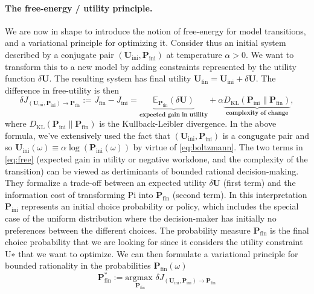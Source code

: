 \documentclass{article} %
\def\U{\mathbf{U}}
\def\P{\mathbf{P}}
\begin{document}
  \paragraph{The free-energy / utility principle.}
  We are now in shape to introduce the notion of free-energy for model transitions, and a variational principle for optimizing it. Consider thus an initial system described by a conjugate pair $(\U_{\text{ini}}, \P_{\text{ini}})$ at temperature $\alpha > 0$. We want to transform this to a new model by adding constraints represented by the utility function $\delta \U$.  The resulting system has final utility $\U_{\text{fin}} = \U_{\text{ini}} + \delta\U$. The difference in free-utility is then
  \begin{equation}
    \delta J_{(\U_{\text{ini}}, \P_{\text{ini}}) \rightarrow \P_{\text{fin}}} := J_{\text{fin}} - J_{\text{ini}} = \underbrace{\mathbb E_{\P_{\text{fin}}}(\delta \U)}_{\textbf{expected gain in utility}} + \alpha \underbrace{D_{\text{KL}}(\P_{\text{ini}}\|\P_{\text{fin}})}_{\textbf{complexity of change}},
    \label{eq:free}
  \end{equation}
  where $D_{\text{KL}}(\P_{\text{ini}}\|\P_{\text{fin}})$ is the Kullback-Leibler divergence.
  In the above formula, we've extensively used the fact that $(\U_{\text{ini}}, \P_{\text{ini}})$ is a congugate pair and so $\U_{\text{ini}}(\omega) \equiv \alpha \log(\P_{\text{ini}}(\omega))$ by virtue of \eqref{eq:boltzmann}.
  The two terms in \eqref{eq:free} (expected gain in utility or negative workdone, and the complexity of the transition) can be viewed as dertiminants of bounded rational decision-making. They formalize
a trade-off between an expected utility $\delta \U$ (first term) and
the information cost of transforming Pi
into $\P_{\text{fin}}$ (second
term). In this interpretation $\P_{\text{ini}}$ represents an initial choice
probability or policy, which includes the special case of the
uniform distribution where the decision-maker has initially no
preferences between the different choices. The probability measure $\P_{\text{fin}}$ is the final choice probability that we are looking for since it
considers the utility constraint U∗
that we want to optimize. We can then formulate a variational principle for bounded rationality in the probabilities $\P_{\text{fin}}(\omega)$
\begin{equation}
\P^*_{\text{fin}} := \underset{\P_{\text{fin}}}{\text{argmax }} \delta J_{(\U_{\text{ini}}, \P_{\text{ini}}) \rightarrow \P_{\text{fin}}}
  \end{equation}
\end{document}

